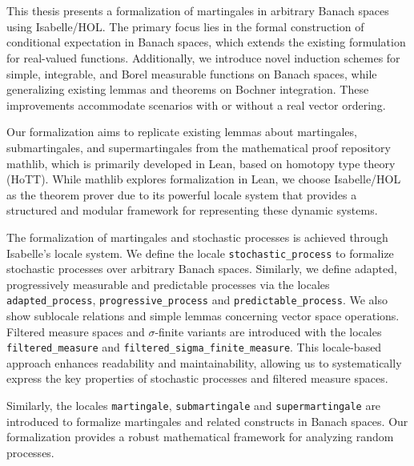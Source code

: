﻿\chapter{\abstractname}
This thesis presents a formalization of martingales in arbitrary Banach spaces using Isabelle/HOL. The primary focus lies in the formal construction of conditional expectation in Banach spaces, which extends the existing formulation for real-valued functions. Additionally, we introduce novel induction schemes for simple, integrable, and Borel measurable functions on Banach spaces, while generalizing existing lemmas and theorems on Bochner integration. These improvements accommodate scenarios with or without a real vector ordering.

Our formalization aims to replicate existing lemmas about martingales, submartingales, and supermartingales from the mathematical proof repository mathlib, which is primarily developed in Lean, based on homotopy type theory (HoTT). While mathlib explores formalization in Lean, we choose Isabelle/HOL as the theorem prover due to its powerful locale system that provides a structured and modular framework for representing these dynamic systems.

The formalization of martingales and stochastic processes is achieved through Isabelle's locale system. We define the locale \lstinline{stochastic_process} to formalize stochastic processes over arbitrary Banach spaces. Similarly, we define adapted, progressively measurable and predictable processes via the locales \lstinline{adapted_process}, \lstinline{progressive_process} and \lstinline{predictable_process}. We also show sublocale relations and simple lemmas concerning vector space operations. Filtered measure spaces and $\sigma$-finite variants are introduced with the locales \lstinline{filtered_measure} and \lstinline{filtered_sigma_finite_measure}. This locale-based approach enhances readability and maintainability, allowing us to systematically express the key properties of stochastic processes and filtered measure spaces.

Similarly, the locales \lstinline{martingale}, \lstinline{submartingale} and \lstinline{supermartingale} are introduced to formalize martingales and related constructs in Banach spaces. Our formalization provides a robust mathematical framework for analyzing random processes.